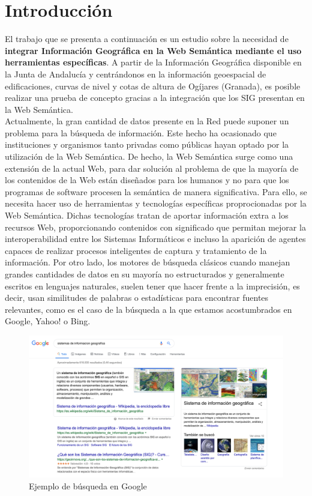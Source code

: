 \section{Introducción}



El trabajo que se presenta a continuación es un estudio sobre la necesidad de \textbf{integrar Información Geográfica en la Web Semántica mediante el uso herramientas específicas}. A partir de la Información Geográfica disponible en la Junta de Andalucía y centrándonos en la información geoespacial de edificaciones, curvas de nivel y cotas de altura de Ogíjares (Granada), es posible realizar una prueba de concepto gracias a la integración que los SIG presentan en la Web Semántica.\\

Actualmente, la gran cantidad de datos presente en la Red puede suponer un problema para la búsqueda de información. Este hecho ha ocasionado que instituciones y organismos tanto privadas como públicas hayan optado por la utilización de la Web Semántica. De hecho, la Web Semántica surge como una extensión de la actual Web, para dar solución al problema de que la mayoría de los contenidos de la Web están diseñados para los humanos y no para que los programas de software procesen la semántica de manera significativa. Para ello, se necesita hacer uso de herramientas y tecnologías específicas proprocionadas por la Web Semántica. Dichas tecnologías tratan de aportar información extra a los recursos Web, proporcionando contenidos con significado que permitan mejorar la interoperabilidad entre los Sistemas Informáticos e incluso la aparición de agentes capaces de realizar procesos inteligentes de captura y tratamiento de la información. Por otro lado, los motores de búsqueda clásicos cuando manejan grandes cantidades de datos en su mayoría no estructurados y generalmente escritos en lenguajes naturales, suelen tener que hacer frente a la imprecisión, es decir, usan similitudes de palabras o estadísticas para encontrar fuentes relevantes, como es el caso de la búsqueda a la que estamos acostumbrados en Google, Yahoo! o Bing.

\begin{figure}[H]
	\centering
	\includegraphics[width=1.07\linewidth]{imagenes/capitulo1/ejemplo-sig1}
	\caption{Ejemplo de búsqueda en Google}
	\label{fig:ejemplo-sig}
\end{figure}

